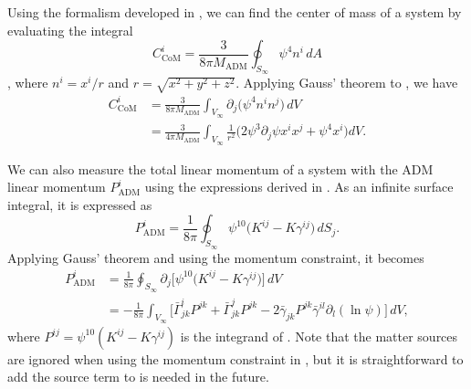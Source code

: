 \documentclass{../document}
\begin{document}
      Using the formalism developed in \cite{Baskaran_2003}, we can find the center of mass of a system by evaluating the integral
      \begin{equation} \label{eq:CoM-surf}
        C_\text{CoM}^i = \frac{3}{8 \pi M_\text{ADM}}
                         \oint_{S_\infty} \psi^4 n^i \, dA
      \end{equation}
      \cite[]{Serguei}, where $n^i = x^i / r$ and $r = \sqrt{x^2 + y^2 + z^2}$. Applying Gauss' theorem to \eq{\eqref{eq:CoM-surf}}, we have
      \begin{align}
        C_\text{CoM}^i
        &= \frac{3}{8 \pi M_\text{ADM}}
            \int_{V_\infty} \partial_j \Big( \psi^4 n^i n^j \Big) \, dV \label{eq:CoM-Gauss} \\
        &= \frac{3}{4 \pi M_\text{ADM}}
            \int_{V_\infty} \frac{1}{r^2} \Big(
              2 \psi^3 \partial_j \psi x^i x^j
              + \psi^4 x^i
            \Big) dV. \label{eq:CoM-vol}
      \end{align}

      We can also measure the total linear momentum of a system with the ADM linear momentum $P_\text{ADM}^i$ using the expressions derived in \cite[]{Serguei}. As an infinite surface integral, it is expressed as
      \begin{equation} \label{eq:Padm-surf}
        P_\text{ADM}^i = \frac{1}{8\pi}
                          \oint_{S_\infty} \psi^{10} \Big(
                            K^{ij} - K \gamma^{ij}
                           \Big) \, dS_j.
      \end{equation}
      Applying Gauss' theorem and using the momentum constraint, it becomes
      \begin{align}
        P_\text{ADM}^i
        &= \frac{1}{8\pi}
            \oint_{S_\infty} \partial_j \Big[ \psi^{10} \Big(
              K^{ij} - K \gamma^{ij}
            \Big) \Big] \, dV \label{eq:Padm-Gauss} \\
        &= - \frac{1}{8\pi}
              \int_{V_\infty} \Big[
                \bar\Gamma^i_{jk} P^{jk}
                + \bar\Gamma^j_{jk} P^{jk}
                - 2 \bar\gamma_{jk} P^{jk} \bar\gamma^{il}
                                           \partial_l(\ln\psi)
              \Big] \, dV, \label{eq:Padm-vol}
      \end{align}
      where $P^{ij} = \psi^{10} (K^{ij} - K \gamma^{ij})$ is the integrand of \eq{\eqref{eq:Padm-surf}}. Note that the matter sources are ignored when using the momentum constraint in \cite{BaumgarteShapiro}, but it is straightforward to add the source term to \eq{\eqref{eq:Padm-vol}} is needed in the future.
\end{document}
